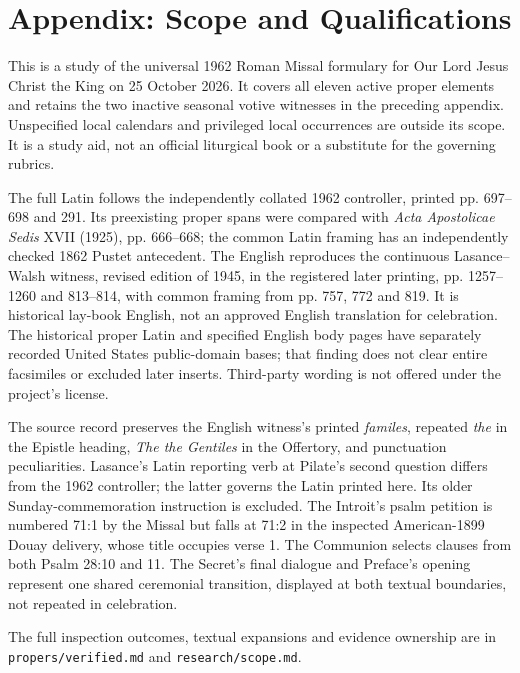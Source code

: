 \section{Appendix: Scope and Qualifications}
This is a study of the universal 1962 Roman Missal formulary for Our Lord Jesus Christ the King on 25 October 2026. It covers all eleven active proper elements and retains the two inactive seasonal votive witnesses in the preceding appendix. Unspecified local calendars and privileged local occurrences are outside its scope. It is a study aid, not an official liturgical book or a substitute for the governing rubrics.

The full Latin follows the independently collated 1962 controller, printed pp. 697--698 and 291. Its preexisting proper spans were compared with \emph{Acta Apostolicae Sedis} XVII (1925), pp. 666--668; the common Latin framing has an independently checked 1862 Pustet antecedent. The English reproduces the continuous Lasance--Walsh witness, revised edition of 1945, in the registered later printing, pp. 1257--1260 and 813--814, with common framing from pp. 757, 772 and 819. It is historical lay-book English, not an approved English translation for celebration. The historical proper Latin and specified English body pages have separately recorded United States public-domain bases; that finding does not clear entire facsimiles or excluded later inserts. Third-party wording is not offered under the project's license.

The source record preserves the English witness's printed \emph{familes}, repeated \emph{the} in the Epistle heading, \emph{The the Gentiles} in the Offertory, and punctuation peculiarities. Lasance's Latin reporting verb at Pilate's second question differs from the 1962 controller; the latter governs the Latin printed here. Its older Sunday-commemoration instruction is excluded. The Introit's psalm petition is numbered 71:1 by the Missal but falls at 71:2 in the inspected American-1899 Douay delivery, whose title occupies verse 1. The Communion selects clauses from both Psalm 28:10 and 11. The Secret's final dialogue and Preface's opening represent one shared ceremonial transition, displayed at both textual boundaries, not repeated in celebration.

The full inspection outcomes, textual expansions and evidence ownership are in \texttt{propers/verified.md} and \texttt{research/scope.md}.

